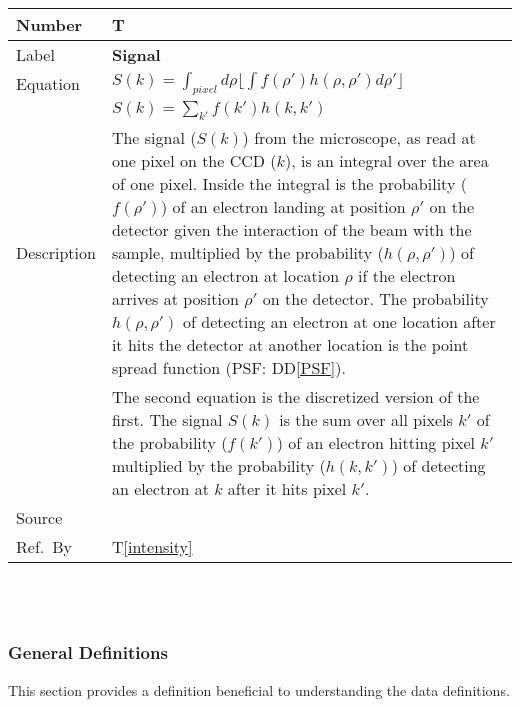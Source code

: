 \documentclass[12pt]{article}
\newcommand{\colAwidth}{0.13\textwidth}
\newcommand{\colBwidth}{0.82\textwidth}
\newcommand{\ddref}[1]{DD\ref{#1}}
\newcounter{theorynum} %
\newcommand{\tref}[1]{T\ref{#1}}
\begin{document}
\noindent
\begin{minipage}{\textwidth}
	\renewcommand*{\arraystretch}{1.5}
	\begin{tabular}{| p{\colAwidth} | p{\colBwidth}|}
		  \hline
		  \rowcolor[gray]{0.9}
		  Number& T{theorynum}\thetheorynum \label{signal}\\
		  \hline
		  Label&\bf Signal \\
		  \hline
		  Equation& $S(k)=\int_{pixel}d\rho \lfloor \int f(\rho') h(\rho, \rho') d\rho' \rfloor$ \\
		  & $ S(k)=\sum_{k'} f(k') h(k, k')$\\
		  \hline
		  Description & The signal ($S(k)$) from the microscope, as read at one pixel on the CCD ($k$), is an integral over the area of one pixel. Inside the integral is the probability ($f(\rho')$) of an electron landing at position $\rho'$ on the detector given the interaction of the beam with the sample, multiplied by the probability ($h(\rho, \rho')$) of detecting an electron at location $\rho$ if the electron arrives at position $\rho'$ on the detector. The probability $h(\rho, \rho')$ of detecting an electron at one location after it hits the detector at another location is the point spread function (PSF: \ddref{PSF}).\\
		  & The second equation is the discretized version of the first. The signal $S(k)$ is the sum over all pixels $k'$ of the probability ($f(k')$) of an electron hitting pixel $k'$ multiplied by the probability ($h(k, k')$) of detecting an electron at $k$ after it hits pixel $k'$.\\
		  \hline
		  Source & \cite{zuo_electron_2000}\\
		  \hline
		  Ref.\ By & \tref{intensity}\\
		  \hline
	\end{tabular}
\end{minipage}\\

~\newline

\subsubsection{General Definitions}\label{sec_gendef}

This section provides a definition beneficial to understanding the data definitions.

~\newline
\end{document}
